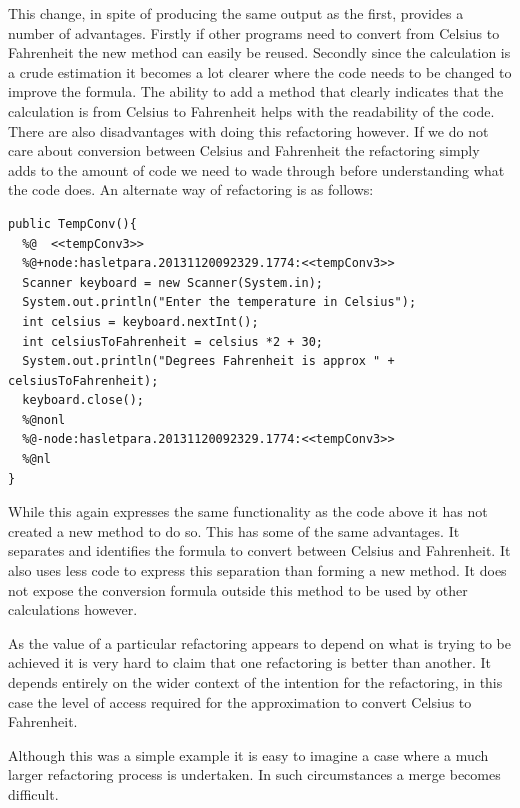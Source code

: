 \documentclass[12pt]{CRPITStyle}
\begin{document}
This change, in spite of producing the same output as the first, provides a number of advantages. Firstly if other programs need to convert from Celsius to Fahrenheit the new method can easily be reused. Secondly since the calculation is a crude estimation it becomes a lot clearer where the code needs to be changed to improve the formula. The ability to add a method that clearly indicates that the calculation is from Celsius to Fahrenheit helps with the readability of the code. There are also disadvantages with doing this refactoring however. If we do not care about conversion between Celsius and Fahrenheit the refactoring simply adds to the amount of code we need to wade through before understanding what the code does. An alternate way of refactoring is as follows:

\begin{verbatim}
public TempConv(){
  %@  <<tempConv3>>
  %@+node:hasletpara.20131120092329.1774:<<tempConv3>>
  Scanner keyboard = new Scanner(System.in);
  System.out.println("Enter the temperature in Celsius");
  int celsius = keyboard.nextInt();
  int celsiusToFahrenheit = celsius *2 + 30;
  System.out.println("Degrees Fahrenheit is approx " + celsiusToFahrenheit);
  keyboard.close();
  %@nonl
  %@-node:hasletpara.20131120092329.1774:<<tempConv3>>
  %@nl
}
\end{verbatim}

While this again expresses the same functionality as the code above it has not created a new method to do so. This has some of the same advantages. It separates and identifies the formula to convert between Celsius and Fahrenheit. It also uses less code to express this separation than forming a new method. It does not expose the conversion formula outside this method to be used by other calculations however.

As the value of a particular refactoring appears to depend on what is trying to be achieved it is very hard to claim that one refactoring is better than another. It depends entirely on the wider context of the intention for the refactoring, in this case the level of access required for the approximation to convert Celsius to Fahrenheit.

Although this was a simple example it is easy to imagine a case where a much larger refactoring process is undertaken. In such circumstances a merge becomes difficult. 
\end{document}
